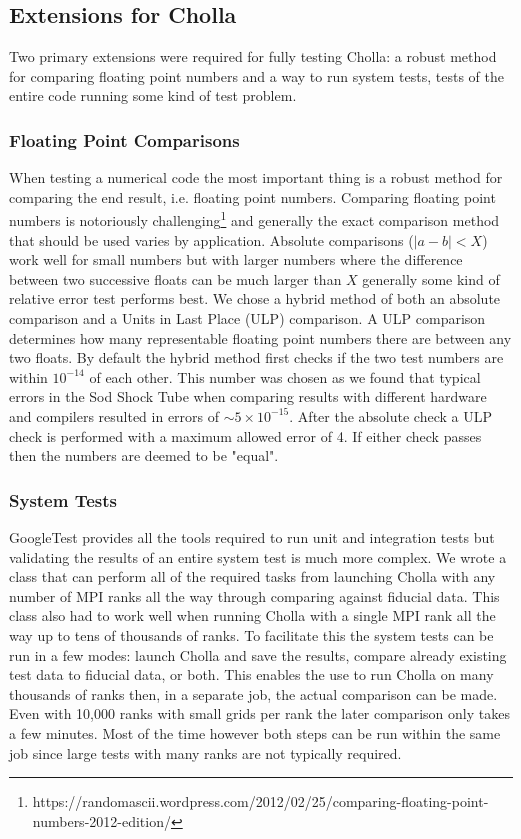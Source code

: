 \subsection{Extensions for Cholla}

Two primary extensions were required for fully testing Cholla: a robust method for comparing floating point numbers and a way to run system tests, tests of the entire code running some kind of test problem.

\subsubsection{Floating Point Comparisons}
\label{sec:fp-comparing}

When testing a numerical code the most important thing is a robust method for comparing the end result, i.e. floating point numbers. Comparing floating point numbers is notoriously challenging\footnote{https://randomascii.wordpress.com/2012/02/25/comparing-floating-point-numbers-2012-edition/} and generally the exact comparison method that should be used varies by application. Absolute comparisons ($|a-b| < X$) work well for small numbers but with larger numbers where the difference between two successive floats can be much larger than $X$ generally some kind of relative error test performs best. We chose a hybrid method of both an absolute comparison and a Units in Last Place (ULP) comparison. A ULP comparison determines how many representable floating point numbers there are between any two floats. By default the hybrid method first checks if the two test numbers are within $10^{-14}$ of each other. This number was chosen as we found that typical errors in the Sod Shock Tube when comparing results with different hardware and compilers resulted in errors of $\sim5\times10^{-15}$. After the absolute check a ULP check is performed with a maximum allowed error of 4. If either check passes then the numbers are deemed to be "equal".

\subsubsection{System Tests}

GoogleTest provides all the tools required to run unit and integration tests but validating the results of an entire system test is much more complex. We wrote a class that can perform all of the required tasks from launching Cholla with any number of MPI ranks all the way through comparing against fiducial data. This class also had to work well when running Cholla with a single MPI rank all the way up to tens of thousands of ranks. To facilitate this the system tests can be run in a few modes: launch Cholla and save the results, compare already existing test data to fiducial data, or both. This enables the use to run Cholla on many thousands of ranks then, in a separate job, the actual comparison can be made. Even with 10,000 ranks with small grids per rank the later comparison only takes a few minutes. Most of the time however both steps can be run within the same job since large tests with many ranks are not typically required.


